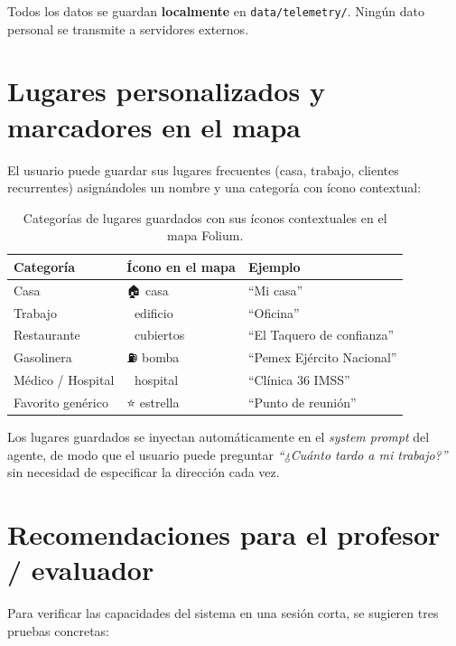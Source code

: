 \documentclass[11pt,a4paper]{article}
\begin{document}
Todos los datos se guardan \textbf{localmente} en
\texttt{data/telemetry/}. Ningún dato personal se transmite a
servidores externos.

\section{Lugares personalizados y marcadores en el mapa}

El usuario puede guardar sus lugares frecuentes (casa, trabajo,
clientes recurrentes) asignándoles un nombre y una categoría con
ícono contextual:

\begin{table}[H]
\centering
\small
\renewcommand{\arraystretch}{1.4}
\begin{tabular}{@{}l l l@{}}
\toprule
\rowcolor{vialNavy!10}
\textbf{Categoría} & \textbf{Ícono en el mapa} & \textbf{Ejemplo} \\
\midrule
Casa & 🏠 casa & ``Mi casa'' \\
Trabajo & 🏢 edificio & ``Oficina'' \\
Restaurante & 🍴 cubiertos & ``El Taquero de confianza'' \\
Gasolinera & ⛽ bomba & ``Pemex Ejército Nacional'' \\
Médico / Hospital & 🏥 hospital & ``Clínica 36 IMSS'' \\
Favorito genérico & ⭐ estrella & ``Punto de reunión'' \\
\bottomrule
\end{tabular}
\caption{Categorías de lugares guardados con sus íconos contextuales en el mapa Folium.}
\label{tab:lugares}
\end{table}

Los lugares guardados se inyectan automáticamente en el \emph{system
prompt} del agente, de modo que el usuario puede preguntar
\textit{``¿Cuánto tardo a mi trabajo?''} sin necesidad de especificar
la dirección cada vez.

\section{Recomendaciones para el profesor / evaluador}

Para verificar las capacidades del sistema en una sesión corta,
se sugieren tres pruebas concretas:
\end{document}
